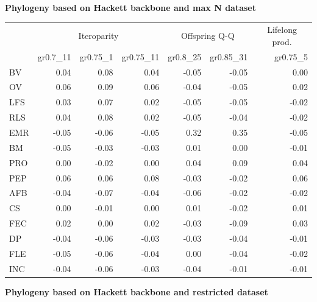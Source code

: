 \begin{landscape}
\begin{table}
\begin{footnotesize}
\textbf{Phylogeny based on Hackett backbone and max N dataset}

\begin{tabular}{@{}l|rrr|rr|r@{}}
\toprule
 & \multicolumn{3}{c|}{Iteroparity} & \multicolumn{2}{c|}{Offspring Q-Q} & \multicolumn{1}{c}{Lifelong prod.}\\
 & gr0.7\_11 & gr0.75\_1 & gr0.75\_11 & gr0.8\_25 & gr0.85\_31 & gr0.75\_5\\
\midrule
BV & 0.04 & 0.08 & 0.04 & -0.05 & -0.05 & 0.00\\
OV & 0.06 & 0.09 & 0.06 & -0.04 & -0.05 & 0.02\\
LFS & 0.03 & 0.07 & 0.02 & -0.05 & -0.05 & -0.02\\
RLS & 0.04 & 0.08 & 0.02 & -0.05 & -0.04 & -0.02\\
EMR & -0.05 & -0.06 & -0.05 & 0.32 & 0.35 & -0.05\\
BM & -0.05 & -0.03 & -0.03 & 0.01 & 0.00 & -0.01\\
PRO & 0.00 & -0.02 & 0.00 & 0.04 & 0.09 & 0.04\\
PEP & 0.06 & 0.06 & 0.08 & -0.03 & -0.02 & 0.06\\
AFB & -0.04 & -0.07 & -0.04 & -0.06 & -0.02 & -0.02\\
CS & 0.00 & -0.01 & 0.00 & 0.01 & -0.02 & 0.01\\
FEC & 0.02 & 0.00 & 0.02 & -0.03 & -0.09 & 0.03\\
DP & -0.04 & -0.06 & -0.03 & -0.03 & -0.04 & -0.01\\
FLE & -0.05 & -0.06 & -0.04 & 0.00 & -0.04 & -0.02\\
INC & -0.04 & -0.06 & -0.03 & -0.04 & -0.01 & -0.01\\
\bottomrule
\end{tabular}

\textbf{Phylogeny based on Hackett backbone and restricted dataset}


\end{footnotesize}
\end{table}
\end{landscape}
